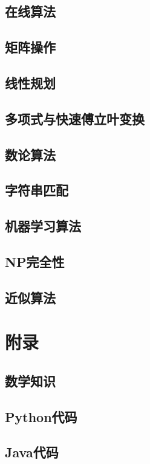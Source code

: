 \documentclass[lang=cn,newtx,10pt,scheme=chinese]{elegantbook}
\begin{document}
\chapter{在线算法}\label{chapter-27}

\chapter{矩阵操作}\label{chapter-28}

\chapter{线性规划}\label{chapter-29}

\chapter{多项式与快速傅立叶变换}\label{chapter-30}

\chapter{数论算法}\label{chapter-31}

\chapter{字符串匹配}\label{chapter-32}

\chapter{机器学习算法}\label{chapter-33}

\chapter{NP完全性}\label{chapter-34}

\chapter{近似算法}\label{chapter-35}

\appendix

\part{附录}

\chapter{数学知识}

\chapter{Python代码}

\chapter{Java代码}
\end{document}
